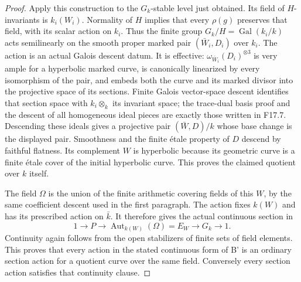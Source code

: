 \begin{proof}
Apply this construction to the $G_k$-stable level just obtained.
Its field of $H$-invariants is $k_i(W_i)$. Normality of $H$
implies that every $\rho(g)$ preserves that field, with its
scalar action on $k_i$. Thus the finite group
$G_k/H=\operatorname{Gal}(k_i/k)$ acts semilinearly on the
smooth proper marked pair $(\bar W_i,D_i)$ over $k_i$.
The action is an actual Galois descent datum. It is effective:
$\omega_{\bar W_i}(D_i)^{\otimes3}$ is very ample for a
hyperbolic marked curve, is canonically linearized by every
isomorphism of the pair, and embeds both the curve and its
marked divisor into the projective space of its sections.
Finite Galois vector-space descent identifies that section
space with $k_i\otimes_k$ its invariant space; the trace-dual
basis proof and the descent of all homogeneous ideal pieces
are exactly those written in F17.7. Descending these ideals
gives a projective pair $(\bar W,D)/k$ whose base change is
the displayed pair. Smoothness and the finite \'etale property
of $D$ descend by faithful flatness. Its complement $W$ is
hyperbolic because its geometric curve is a finite \'etale
cover of the initial hyperbolic curve. This proves the claimed
quotient over $k$ itself.

The field $\Omega$ is the union of the finite arithmetic
covering fields of this $W$, by the same coefficient descent
used in the first paragraph. The action fixes $k(W)$ and has
its prescribed action on $\bar k$. It therefore gives the
actual continuous section in
\[
 1\longrightarrow P\longrightarrow
 \operatorname{Aut}_{k(W)}(\Omega)=E_W
 \longrightarrow G_k\longrightarrow1.                    \tag{ZCF.5}
\]
Continuity again follows from the open stabilizers of finite
sets of field elements. This proves that every action in the
stated continuous form of B' is an ordinary section action
for a quotient curve over the same field. Conversely every
section action satisfies that continuity clause.


\end{proof}
